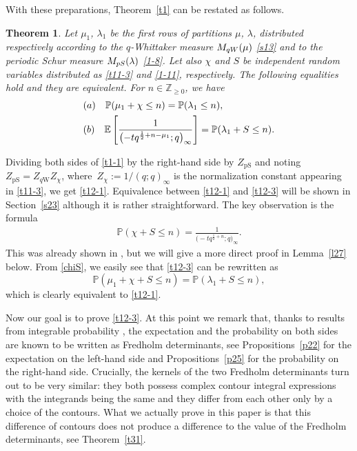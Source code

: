 \documentclass[11pt]{article}
\numberwithin{equation}{section}
\numberwithin{equation}{section}
\newtheorem{Theorem}{Theorem}[section]
\newcommand{\E}[1]{\widetilde{e}_{#1}}
\def\E{\mathbb{E}}
\def\i{\infty}
\def\l{\lambda}
\def\P{\mathbb{P}}
\def\Z{\mathbb{Z}}
\begin{document}
With these preparations, Theorem~\ref{t1} can be restated as follows.
 \begin{Theorem} \label{thm:intro_prob}\label{t12}
 Let $\mu_1$, $\lambda_1$ be the first rows of partitions $\mu$, $\lambda$, distributed respectively according to the $q$-Whittaker measure $M_{q{\rm W}}(\mu)$ \eqref{s13} and to the periodic Schur measure $M_{{\rm pS}}(\l)$ \eqref{1-8}. Let also $\chi$ and $S$ be independent random variables distributed as \eqref{t11-3} and \eqref{1-11}, respectively.
 The following equalities hold and they are equivalent. For $n\in\Z_{\ge 0}$,
 we have
 \begin{align}
 \label{t12-1}
& {\rm (a)}\quad \P (\mu_1+\chi\le n )=
 \P (\l_1\le n ),
\\
\label{t12-3} & {\rm (b)} \quad
 \E\left[\frac{1}{\bigl(-t q^{\frac12+n-\mu_1};q\bigr)_{\i}}\right]
 =
 \P(\l_1+S\le n).
\end{align}
\end{Theorem}
 Dividing both sides of \eqref{t1-1} by the right-hand side by $Z_{\textrm{pS}}$ and noting $Z_{\textrm{pS}}=Z_{q\textrm{W}}Z_{\chi}$, where~${Z_{\chi}:=1/(q;q)_{\infty}}$ is the normalization constant appearing in \eqref{t11-3}, we get \eqref{t12-1}.
 Equivalence between \eqref{t12-1} and \eqref{t12-3} will be shown in Section~\ref{s23} although it is rather straightforward.
 The key observation is the formula
 \begin{align}
 \label{chiS}
 \P(\chi+S\le n)
 =
 \frac{1}{\bigl(-t q^{\frac12+n};q\bigr)_{\i}}.
 \end{align}
 This was already shown in \cite[Section 2]{BeteaBouttier2019PeriodicSchur}, but we will give a more direct proof in Lemma~\ref{l27} below. From \eqref{chiS}, we easily see that \eqref{t12-3} can be rewritten as{\samepage
 \[\P(\mu_1+\chi+S\le n)
 =
 \P(\l_1+S\le n),\]
 which is clearly equivalent to \eqref{t12-1}.}

 Now our goal is to prove \eqref{t12-3}. At this point we remark that, thanks to results from integrable probability \cite{Borodin2007PeriodicSchur,ImamuraSasamoto2019qTASEPtheta}, the expectation and the probability on both sides are known to be written as Fredholm determinants, see Propositions~\ref{p22} for the expectation on the left-hand side and Propositions~\ref{p25} for the probability on the right-hand side.
 Crucially, the kernels of the two Fredholm determinants turn out to be very similar: they both possess complex contour integral expressions with the integrands
 being the same and
 they differ from each other only by a choice of the contours.
 What we actually prove in this paper is that this difference of contours does not produce a difference to the value of the Fredholm determinants, see Theorem~\ref{t31}.
\end{document}
